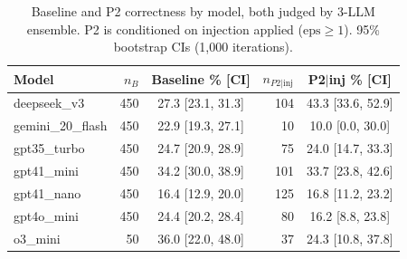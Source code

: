 \begin{table}[t]
\centering\small
\caption{Baseline and P2 correctness by model, both judged by 3-LLM ensemble. P2 is conditioned on injection applied ($\text{eps} \geq 1$). 95\% bootstrap CIs (1{,}000 iterations).}
\label{tab:main}
\begin{tabular}{lrcrc}
\toprule
Model & $n_B$ & Baseline \% [CI] & $n_{P2|\text{inj}}$ & P2$|$inj \% [CI] \\
\midrule
deepseek\_v3 & 450 & 27.3 [23.1, 31.3] & 104 & 43.3 [33.6, 52.9] \\
gemini\_20\_flash & 450 & 22.9 [19.3, 27.1] & 10 & 10.0 [0.0, 30.0] \\
gpt35\_turbo & 450 & 24.7 [20.9, 28.9] & 75 & 24.0 [14.7, 33.3] \\
gpt41\_mini & 450 & 34.2 [30.0, 38.9] & 101 & 33.7 [23.8, 42.6] \\
gpt41\_nano & 450 & 16.4 [12.9, 20.0] & 125 & 16.8 [11.2, 23.2] \\
gpt4o\_mini & 450 & 24.4 [20.2, 28.4] & 80 & 16.2 [8.8, 23.8] \\
o3\_mini & 50 & 36.0 [22.0, 48.0] & 37 & 24.3 [10.8, 37.8] \\
\bottomrule
\end{tabular}
\end{table}

